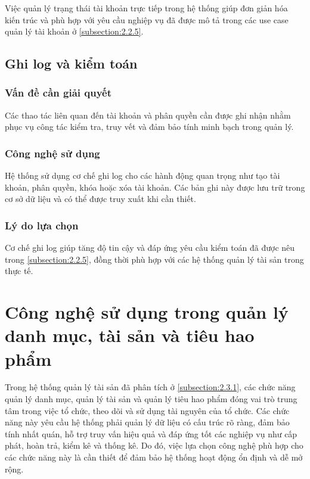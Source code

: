 \documentclass[../DoAn.tex]{subfiles}
\begin{document}
Việc quản lý trạng thái tài khoản trực tiếp trong hệ thống giúp đơn giản hóa kiến trúc và phù hợp với yêu cầu nghiệp vụ đã được mô tả trong các use case quản lý tài khoản ở \autoref{subsection:2.2.5}.

\subsection{Ghi log và kiểm toán}

\subsubsection{Vấn đề cần giải quyết}

Các thao tác liên quan đến tài khoản và phân quyền cần được ghi nhận nhằm phục vụ công tác kiểm tra, truy vết và đảm bảo tính minh bạch trong quản lý.

\subsubsection{Công nghệ sử dụng}

Hệ thống sử dụng cơ chế ghi log cho các hành động quan trọng như tạo tài khoản, phân quyền, khóa hoặc xóa tài khoản. Các bản ghi này được lưu trữ trong cơ sở dữ liệu và có thể được truy xuất khi cần thiết.

\subsubsection{Lý do lựa chọn}

Cơ chế ghi log giúp tăng độ tin cậy và đáp ứng yêu cầu kiểm toán đã được nêu trong \autoref{subsection:2.2.5}, đồng thời phù hợp với các hệ thống quản lý tài sản trong thực tế.

\section{Công nghệ sử dụng trong quản lý danh mục, tài sản và tiêu hao phẩm}
\label{section:3.y}

Trong hệ thống quản lý tài sản đã phân tích ở \autoref{subsection:2.3.1}, các chức năng quản lý danh mục, quản lý tài sản và quản lý tiêu hao phẩm đóng vai trò trung tâm trong việc tổ chức, theo dõi và sử dụng tài nguyên của tổ chức. Các chức năng này yêu cầu hệ thống phải quản lý dữ liệu có cấu trúc rõ ràng, đảm bảo tính nhất quán, hỗ trợ truy vấn hiệu quả và đáp ứng tốt các nghiệp vụ như cấp phát, hoàn trả, kiểm kê và thống kê. Do đó, việc lựa chọn công nghệ phù hợp cho các chức năng này là cần thiết để đảm bảo hệ thống hoạt động ổn định và dễ mở rộng.
\end{document}
